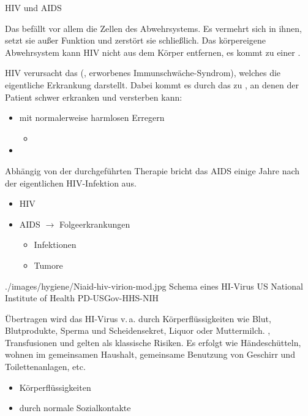 \TextSlideTeaser
{HIV und AIDS}%
{%
Das  befällt vor allem die
Zellen des Abwehrsystems. Es vermehrt sich in ihnen, setzt sie
außer Funktion und zerstört sie schließlich. Das
körpereigene Abwehrsystem kann HIV nicht aus dem Körper
    entfernen, es kommt zu einer .

HIV verursacht das  (, erworbenes
Immunschwäche-Syndrom), welches die eigentliche Erkrankung
darstellt. Dabei kommt es durch das  zu , an denen der Patient
schwer erkranken und versterben kann:
\begin{itemize}
  \item {} mit normalerweise harmlosen
  Erregern
  \begin{itemize}
    \item {}
  \end{itemize}
  \item {}
\end{itemize}
Abhängig von der durchgeführten Therapie bricht das AIDS
einige Jahre nach der eigentlichen HIV-Infektion aus.}%
{
\begin{itemize}
    \item HIV
    \item AIDS $\rightarrow$ Folgeerkrankungen
    \begin{itemize}
      \item Infektionen
      \item Tumore
    \end{itemize}
\end{itemize}}%
{./images/hygiene/Niaid-hiv-virion-mod.jpg}%
{Schema eines HI-Virus}%
{}%
{US National Institute of Health}%
{PD-USGov-HHS-NIH}%







{%
Übertragen wird das HI-Virus v.\,a. durch Körperflüssigkeiten
wie Blut, Blutprodukte, Sperma und Scheidensekret, Liquor oder Muttermilch.
, Transfusionen und
 gelten als klassische Risiken.
Es erfolgt  wie Händeschütteln, wohnen im
gemeinsamen Haushalt, gemeinsame Benutzung von Geschirr und
Toilettenanlagen, etc.
}{
\begin{itemize}
  \item Körperflüssigkeiten
  \item {} durch normale Sozialkontakte
\end{itemize}
}
{}
{}
{}

